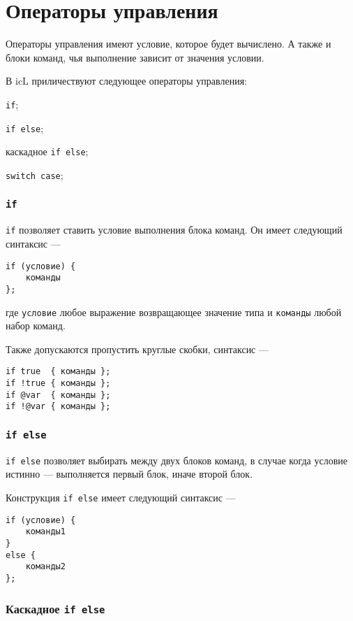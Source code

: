 \section{Операторы управления}

Операторы управления имеют условие, которое будет вычислено. А также и блоки команд, чья выполнение зависит от значения условии.

В icL приличествуют следующее операторы управления:
\begin{icItems}
	\item \texttt{if};
	\item \texttt{if else};
	\item каскадное \texttt{if else};
	\item \texttt{switch case};
\end{icItems}

\subsubsection{\texttt{if}}

\texttt{if} позволяет ставить условие выполнения блока команд. Он имеет следующий синтаксис —
\begin{verbatim}
if (условие) {
	команды
};
\end{verbatim}
где \texttt{условие} любое выражение возвращающее значение типа \bool{} и \texttt{команды} любой набор команд.

Также допускаются пропустить круглые скобки, синтаксис —
\begin{verbatim}
if true  { команды };
if !true { команды };
if @var  { команды };
if !@var { команды };
\end{verbatim}

\subsubsection{\texttt{if else}}

\texttt{if else} позволяет выбирать между двух блоков команд, в случае когда условие истинно — выполняется первый блок, иначе второй блок.

Конструкция \texttt{if else} имеет следующий синтаксис —
\begin{verbatim}
if (условие) {
	команды1
}
else {
	команды2
};
\end{verbatim}

\subsubsection{Каскадное \texttt{if else}}

